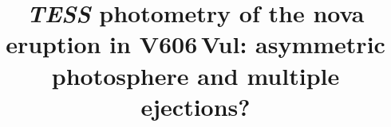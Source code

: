 \documentclass[twocolumn]{aastex631}
\newcommand{\nova}{V606\,Vul}
\begin{document}
\title{{\em TESS} photometry of the nova eruption in \nova{}: asymmetric photosphere and multiple ejections?}


\end{document}

